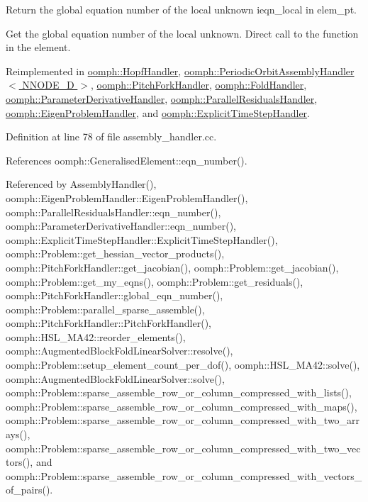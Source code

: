 Return the global equation number of the local unknown ieqn\+\_\+local in elem\+\_\+pt. 

Get the global equation number of the local unknown. Direct call to the function in the element. 

Reimplemented in \hyperlink{classoomph_1_1HopfHandler_a9feb8087e8b9554164c0de002f4ec056}{oomph\+::\+Hopf\+Handler}, \hyperlink{classoomph_1_1PeriodicOrbitAssemblyHandler_ac4d1e4e7e566061c2129157c67adab5b}{oomph\+::\+Periodic\+Orbit\+Assembly\+Handler$<$ N\+N\+O\+D\+E\+\_\+D $>$}, \hyperlink{classoomph_1_1PitchForkHandler_ab29e58e25bd5bebd836e30015f01ac8d}{oomph\+::\+Pitch\+Fork\+Handler}, \hyperlink{classoomph_1_1FoldHandler_a30f2973860c13a183d5647a63b0c2ead}{oomph\+::\+Fold\+Handler}, \hyperlink{classoomph_1_1ParameterDerivativeHandler_a359b3b627532773b4606db1989f9c844}{oomph\+::\+Parameter\+Derivative\+Handler}, \hyperlink{classoomph_1_1ParallelResidualsHandler_a0541d552e54eb2ca8681054180eafb87}{oomph\+::\+Parallel\+Residuals\+Handler}, \hyperlink{classoomph_1_1EigenProblemHandler_ab94bef9c8135c9d2701e96d8205c797d}{oomph\+::\+Eigen\+Problem\+Handler}, and \hyperlink{classoomph_1_1ExplicitTimeStepHandler_a491d39988264739332c3e9c7dbb38344}{oomph\+::\+Explicit\+Time\+Step\+Handler}.



Definition at line 78 of file assembly\+\_\+handler.\+cc.



References oomph\+::\+Generalised\+Element\+::eqn\+\_\+number().



Referenced by Assembly\+Handler(), oomph\+::\+Eigen\+Problem\+Handler\+::\+Eigen\+Problem\+Handler(), oomph\+::\+Parallel\+Residuals\+Handler\+::eqn\+\_\+number(), oomph\+::\+Parameter\+Derivative\+Handler\+::eqn\+\_\+number(), oomph\+::\+Explicit\+Time\+Step\+Handler\+::\+Explicit\+Time\+Step\+Handler(), oomph\+::\+Problem\+::get\+\_\+hessian\+\_\+vector\+\_\+products(), oomph\+::\+Pitch\+Fork\+Handler\+::get\+\_\+jacobian(), oomph\+::\+Problem\+::get\+\_\+jacobian(), oomph\+::\+Problem\+::get\+\_\+my\+\_\+eqns(), oomph\+::\+Problem\+::get\+\_\+residuals(), oomph\+::\+Pitch\+Fork\+Handler\+::global\+\_\+eqn\+\_\+number(), oomph\+::\+Problem\+::parallel\+\_\+sparse\+\_\+assemble(), oomph\+::\+Pitch\+Fork\+Handler\+::\+Pitch\+Fork\+Handler(), oomph\+::\+H\+S\+L\+\_\+\+M\+A42\+::reorder\+\_\+elements(), oomph\+::\+Augmented\+Block\+Fold\+Linear\+Solver\+::resolve(), oomph\+::\+Problem\+::setup\+\_\+element\+\_\+count\+\_\+per\+\_\+dof(), oomph\+::\+H\+S\+L\+\_\+\+M\+A42\+::solve(), oomph\+::\+Augmented\+Block\+Fold\+Linear\+Solver\+::solve(), oomph\+::\+Problem\+::sparse\+\_\+assemble\+\_\+row\+\_\+or\+\_\+column\+\_\+compressed\+\_\+with\+\_\+lists(), oomph\+::\+Problem\+::sparse\+\_\+assemble\+\_\+row\+\_\+or\+\_\+column\+\_\+compressed\+\_\+with\+\_\+maps(), oomph\+::\+Problem\+::sparse\+\_\+assemble\+\_\+row\+\_\+or\+\_\+column\+\_\+compressed\+\_\+with\+\_\+two\+\_\+arrays(), oomph\+::\+Problem\+::sparse\+\_\+assemble\+\_\+row\+\_\+or\+\_\+column\+\_\+compressed\+\_\+with\+\_\+two\+\_\+vectors(), and oomph\+::\+Problem\+::sparse\+\_\+assemble\+\_\+row\+\_\+or\+\_\+column\+\_\+compressed\+\_\+with\+\_\+vectors\+\_\+of\+\_\+pairs().

